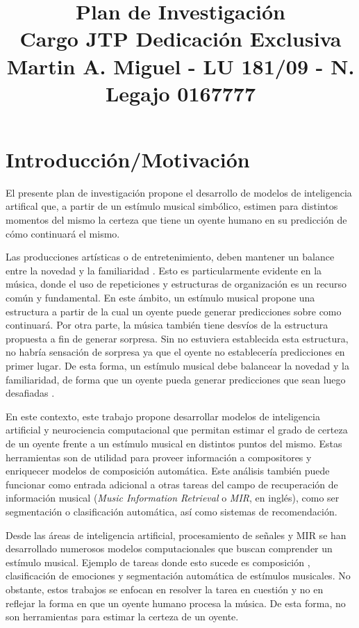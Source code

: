 \documentclass[a4paper,11pt]{article}
\title{\vspace{-3cm}Plan de Investigación  \\ Cargo JTP Dedicación Exclusiva \\
{\large Martin A. Miguel - LU 181/09 - N. Legajo 0167777}}
\date{}
\begin{document}
\maketitle

\vspace{-2cm}
\section*{Introducción/Motivación} 

El presente plan de investigación propone el desarrollo de modelos de
inteligencia artifical que, a partir de un estímulo musical simbólico, estimen
para distintos momentos del mismo la certeza que tiene un oyente humano en su
predicción de cómo continuará el mismo.

Las producciones artísticas o de entretenimiento, deben mantener un balance
entre la novedad y la familiaridad \cite{berlyne1971aesthetics}. Esto es
particularmente evidente en la música, donde el uso de repeticiones y
estructuras de organización es un recurso común y fundamental. En este ámbito,
un estímulo musical propone una estructura a partir de la cual un oyente puede
generar predicciones sobre como continuará. Por otra parte, la música también
tiene desvíos de la estructura propuesta a fin de generar sorpresa. Sin no
estuviera establecida esta estructura, no habría sensación de sorpresa ya que
el oyente no establecería predicciones en primer lugar.  De esta forma, un
estímulo musical debe balancear la novedad y la familiaridad, de forma que un
oyente pueda generar predicciones que sean luego desafiadas
\cite{huron2010musical, vuust2018incongruity}.

En este contexto, este trabajo propone desarrollar modelos de inteligencia
artificial y neurociencia computacional que permitan estimar el grado de certeza
de un oyente frente a un estímulo musical en distintos puntos del mismo.
Estas herramientas son de utilidad para proveer información a compositores y
enriquecer modelos de composición automática. Este análisis también puede
funcionar como entrada adicional a otras tareas del campo de recuperación de
información musical (\emph{Music Information Retrieval} o \emph{MIR}, en
inglés), como ser segmentación o clasificación automática, así como sistemas de
recomendación.

Desde las áreas de inteligencia artificial, procesamiento de señales y MIR se
han desarrollado numerosos modelos computacionales que buscan comprender un
estímulo musical. Ejemplo de tareas donde esto sucede es composición
\cite{briot2020deep}, clasificación de emociones \cite{downie2008mood} y
segmentación automática \cite{mcfee2017evaluating} de estímulos musicales. No
obstante, estos trabajos se enfocan en resolver la tarea en cuestión y no
en reflejar la forma en que un oyente humano procesa la música. De esta forma,
no son herramientas para estimar la certeza de un oyente. 
\end{document}
